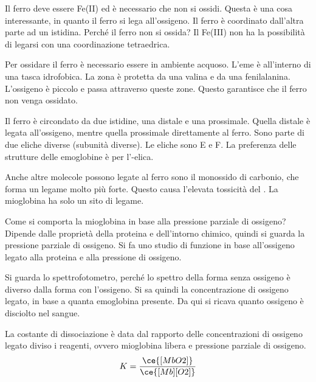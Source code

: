 Il ferro deve essere Fe(II) ed è necessario che non si ossidi. Questa è una cosa
interessante, in quanto il ferro si lega all'ossigeno. Il ferro è
coordinato dall'altra parte ad un istidina.
Perché il ferro non si ossida? Il Fe(III) non ha la possibilità di
legarsi con una coordinazione tetraedrica.


Per ossidare il ferro è necessario essere in ambiente acquoso. L'eme è
all'interno di una tasca idrofobica. La zona è protetta da una valina e
da una fenilalanina.
L'ossigeno è piccolo e passa attraverso queste zone. Questo garantisce
che il ferro non venga ossidato.



Il ferro è circondato da due istidine, una distale e una prossimale.
Quella distale è legata all'ossigeno, mentre quella prossimale
direttamente al ferro. Sono parte di due eliche diverse (subunità
diverse). Le eliche sono E e F.
La preferenza delle strutture delle emoglobine è per l'\alpha-elica.


Anche altre molecole possono legate al ferro sono il monossido di
carbonio, che forma un legame molto più forte. Questo causa l'elevata
tossicità del .
La mioglobina ha solo un sito di legame.

Come si comporta la mioglobina in base alla pressione parziale di
ossigeno?
Dipende dalle proprietà della proteina e dell'intorno chimico, quindi si
guarda la pressione parziale di ossigeno.
Si fa uno studio di funzione in base all'ossigeno legato alla proteina
e alla pressione di ossigeno.

Si guarda lo spettrofotometro, perché lo spettro della forma senza
ossigeno è diverso dalla forma con l'ossigeno. Si sa quindi la
concentrazione di ossigeno legato, in base a quanta emoglobina presente.
Da qui si ricava quanto ossigeno è disciolto nel sangue.


La costante di dissociazione è data dal rapporto delle concentrazioni di ossigeno
legato diviso i reagenti, ovvero mioglobina libera e pressione parziale di ossigeno.
\[
K = \frac{\ce{[MbO2]}}{\ce{[Mb][O2]}}
\]

